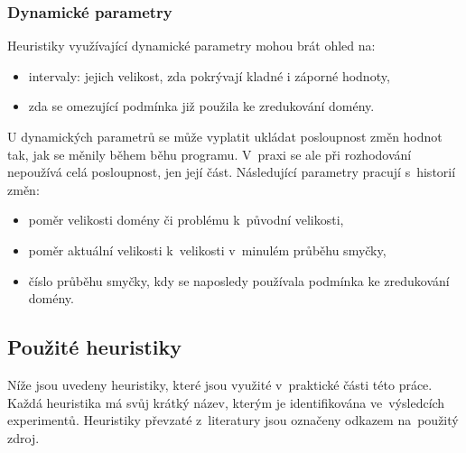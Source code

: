 \subsubsection{Dynamické parametry}

Heuristiky využívající dynamické parametry mohou brát ohled na:

\begin{itemize}
    \item intervaly:
        \subitem jejich velikost,
        \subitem zda pokrývají kladné i záporné hodnoty,
    \item zda se omezující podmínka již použila ke zredukování domény.
\end{itemize}

U dynamických parametrů se může vyplatit ukládat posloupnost změn hodnot tak, jak se měnily během běhu programu. V~praxi se ale při rozhodování nepoužívá celá posloupnost, jen její část. Následující parametry pracují s~historií změn:

\begin{itemize}
  \item poměr velikosti domény či problému k~původní velikosti,
  \item poměr aktuální velikosti k~velikosti v~minulém průběhu smyčky,
  \item číslo průběhu smyčky, kdy se naposledy používala podmínka ke zredukování domény.
\end{itemize}

\subsection{Použité heuristiky}
\label{ch:usedHeuristics}
Níže jsou uvedeny heuristiky, které jsou využité v~praktické části této práce. Každá heuristika má svůj krátký název, kterým je identifikována ve~výsledcích experimentů. Heuristiky převzaté z~literatury jsou označeny odkazem na~použitý zdroj.

